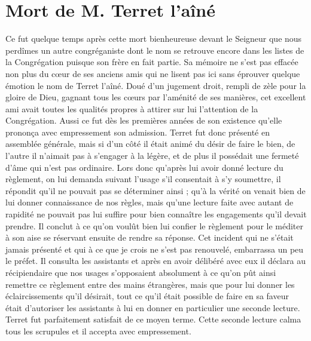 \section*{Mort de M. Terret l’aîné}
Ce fut quelque temps après cette mort bienheureuse devant le Seigneur que nous perdîmes un autre congréganiste dont le nom se retrouve encore dans les listes de la Congrégation puisque son frère en fait partie. Sa mémoire ne s'est pas effacée non plus du cœur de ses anciens amis qui ne lisent pas ici sans
éprouver quelque émotion le nom de Terret l'aîné. Doué d'un jugement droit, rempli de zèle pour la gloire de Dieu, gagnant tous les cœurs par l'aménité de ses manières, cet excellent ami avait toutes les qualités propres à attirer sur lui l'attention de la Congrégation. Aussi ce fut dès les premières années de son existence qu'elle prononça avec empressement son admission. Terret fut donc présenté en assemblée générale, mais si d'un côté il était animé du désir de faire le bien, de l'autre il n'aimait pas à s'engager à la légère, et de plus il possédait une fermeté d'âme qui n'est pas ordinaire. Lors donc qu'après lui avoir donné lecture du règlement, on lui demanda suivant l'usage s'il consentait à s'y soumettre, il répondit qu'il ne pouvait pas se déterminer ainsi ; qu'à la vérité on venait bien de lui donner connaissance de nos règles, mais qu'une lecture faite avec autant de rapidité ne pouvait pas lui suffire pour bien connaître les engagements qu'il devait prendre. Il conclut à ce qu'on voulût bien lui confier le règlement pour le méditer à son aise se réservant ensuite de rendre sa réponse. Cet incident qui ne s'était jamais présenté et qui à ce que je crois ne s'est pas renouvelé, embarrassa un peu le préfet. Il consulta les assistants et après en avoir délibéré avec eux il déclara au récipiendaire que nos usages s'opposaient absolument à ce qu'on pût ainsi remettre ce règlement entre des mains étrangères, mais que pour lui donner les éclaircissements qu'il désirait, tout ce qu'il était possible de faire en sa faveur était d'autoriser les assistants à lui en donner en particulier une seconde lecture. Terret fut parfaitement satisfait de ce moyen terme. Cette seconde lecture calma tous les scrupules et il accepta avec empressement.

